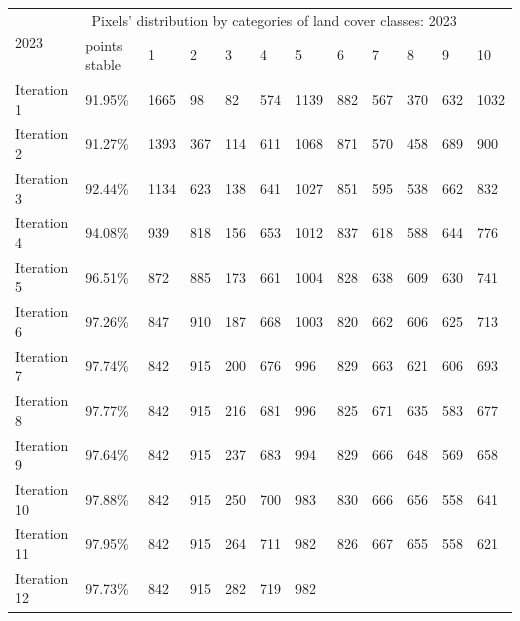 \documentclass[jimaging,article,submit,pdftex,moreauthors]{Definitions/mdpi}
\begin{document}
\begin{table}[H]
  \centering
  \begin{tabularx}{\textwidth}{p{1.6cm}p{1.8cm}p{0.6cm}p{0.6cm}p{0.6cm}p{0.6cm}p{0.6cm}p{0.6cm}p{0.6cm}p{0.6cm}p{0.6cm}p{0.6cm}}
  \toprule
  \multirow{2}{*}{2023} & \multicolumn{10}{c}{Pixels' distribution by categories of land cover classes: 2023} \\
     & points stable & 1 & 2 &  3 & 4 & 5 & 6 & 7 & 8 & 9 & 10 \\
    \midrule
    Iteration 1 & 91.95\% & 1665    &     98    &     82    &    574   &   1139 &
        882   &     567    &    370    &    632   &    1032 \\
    Iteration 2 & 91.27\% & 1393    &    367    &    114    &    611   &    1068 &
        871    &    570   &     458    &    689  &      900 \\
    Iteration 3 & 92.44\% & 1134    &    623      &  138     &   641  &     1027 &
        851     &   595    &    538      &  662       &  832 \\
    Iteration 4 & 94.08\% & 939     &   818     &   156   &     653   &    1012 &
        837 &       618      &  588 &        644     &   776 \\
    Iteration 5 & 96.51\% & 872     &   885      &  173      &  661   &    1004 &
        828  &      638    &    609    &    630  &      741 \\
    Iteration 6 & 97.26\% & 847    &    910  &      187   &     668     &  1003 &
        820   &     662 &       606    &    625     &   713 \\
    Iteration 7 & 97.74\% & 842    &    915 &       200    &    676   &     996 &
        829      &  663  &      621   &     606  &      693 \\
    Iteration 8 & 97.77\% & 842   &     915   &     216    &    681&        996 &
        825  &      671      &  635   &     583   &     677 \\
    Iteration 9 & 97.64\% & 842    &    915    &    237     &   683 &       994 &
        829     &   666 &       648      &  569  &      658 \\
    Iteration 10 & 97.88\% & 842    &    915    &    250     &   700     &   983 &
        830    &    666   &     656     &   558    &    641 \\
    Iteration 11 & 97.95\% & 842      &  915  &      264    &    711    &    982 &
        826  &      667  &      655     &   558   &     621 \\
    Iteration 12 & 97.73\% & 842    &    915    &    282   &     719 &        982 &

\end{tabularx}
\end{table}
\end{document}
